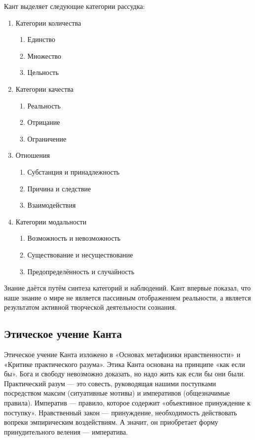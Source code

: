 \documentclass[12pt]{article}
\begin{document}
Кант выделяет следующие категории рассудка:
\begin{enumerate}
\item Категории количества
    \begin{enumerate}
        \item Единство
        \item Множество
        \item Цельность
    \end{enumerate}
    
\item Категории качества
    \begin{enumerate}
        \item Реальность
        \item Отрицание
        \item Ограничение
    \end{enumerate}
\item Отношения
    \begin{enumerate}
        \item Субстанция и принадлежность
        \item Причина и следствие
        \item Взаимодействия
    \end{enumerate}
\item Категории модальности
    \begin{enumerate}
        \item Возможность и невозможность
        \item Существование и несуществование
        \item Предопределённость и случайность
    \end{enumerate}
\end{enumerate}

Знание даётся путём синтеза категорий и наблюдений. Кант впервые показал, что наше знание о мире не
является  пассивным  отображением  реальности,  а  является  результатом  активной  творческой  деятельности
сознания.

\subsection{Этическое учение Канта}
Этическое учение Канта изложено в  «Основах метафизики нравственности» и «Критике практического разума».
Этика Канта основана на принципе «как если бы». Бога и свободу невозможно доказать, но надо жить как если бы они были.
Практический разум — это совесть,  руководящая  нашими  поступками  посредством  максим  (ситуативные  мотивы)  и 
императивов (общезначимые правила).
Императив — правило, которое содержит «объективное принуждение к поступку».
Нравственный закон — принуждение, необходимость действовать вопреки эмпирическим воздействиям.
А значит, он приобретает форму принудительного веления — императива.
\end{document}
